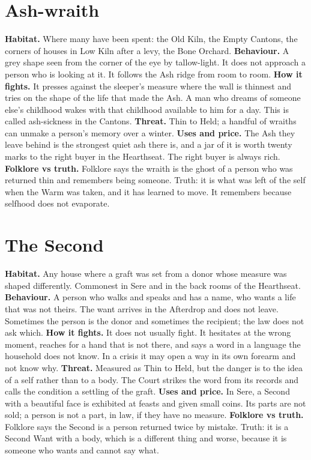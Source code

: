 \documentclass{design/chronicle}
\begin{document}
\section*{Ash-wraith}

\textbf{Habitat.} Where many have been spent: the Old Kiln, the Empty Cantons, the corners of houses in Low Kiln after a levy, the Bone Orchard. \textbf{Behaviour.} A grey shape seen from the corner of the eye by tallow-light. It does not approach a person who is looking at it. It follows the Ash ridge from room to room. \textbf{How it fights.} It presses against the sleeper’s measure where the wall is thinnest and tries on the shape of the life that made the Ash. A man who dreams of someone else’s childhood wakes with that childhood available to him for a day. This is called ash-sickness in the Cantons. \textbf{Threat.} Thin to Held; a handful of wraiths can unmake a person’s memory over a winter. \textbf{Uses and price.} The Ash they leave behind is the strongest quiet ash there is, and a jar of it is worth twenty marks to the right buyer in the Hearthseat. The right buyer is always rich. \textbf{Folklore vs truth.} Folklore says the wraith is the ghost of a person who was returned thin and remembers being someone. Truth: it is what was left of the self when the Warm was taken, and it has learned to move. It remembers because selfhood does not evaporate.

\section*{The Second}

\textbf{Habitat.} Any house where a graft was set from a donor whose measure was shaped differently. Commonest in Sere and in the back rooms of the Hearthseat. \textbf{Behaviour.} A person who walks and speaks and has a name, who wants a life that was not theirs. The want arrives in the Afterdrop and does not leave. Sometimes the person is the donor and sometimes the recipient; the law does not ask which. \textbf{How it fights.} It does not usually fight. It hesitates at the wrong moment, reaches for a hand that is not there, and says a word in a language the household does not know. In a crisis it may open a way in its own forearm and not know why. \textbf{Threat.} Measured as Thin to Held, but the danger is to the idea of a self rather than to a body. The Court strikes the word from its records and calls the condition a settling of the graft. \textbf{Uses and price.} In Sere, a Second with a beautiful face is exhibited at feasts and given small coins. Its parts are not sold; a person is not a part, in law, if they have no measure. \textbf{Folklore vs truth.} Folklore says the Second is a person returned twice by mistake. Truth: it is a Second Want with a body, which is a different thing and worse, because it is someone who wants and cannot say what.
\end{document}
